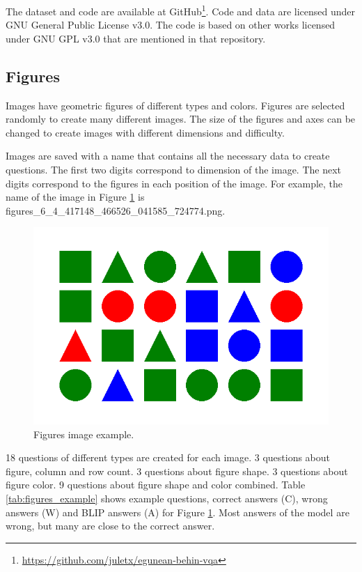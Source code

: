 \documentclass[11pt]{article}
\begin{document}
The dataset and code are available at GitHub\footnote{\url{https://github.com/juletx/egunean-behin-vqa}}. Code and data are licensed under GNU General Public License v3.0. The code is based on other works licensed under GNU GPL v3.0 that are mentioned in that repository.

\subsection{Figures}

Images have geometric figures of different types and colors. Figures are selected randomly to create many different images. The size of the figures and axes can be changed to create images with different dimensions and difficulty. 

Images are saved with a name that contains all the necessary data to create questions. The first two digits correspond to dimension of the image. The next digits correspond to the figures in each position of the image. For example, the name of the image in Figure \ref{fig:figures_example} is figures\_6\_4\_417148\_466526\_041585\_724774.png.

\begin{figure}[ht]
    \centering
    \includegraphics[width=\linewidth]{figures_6_4_417148_466526_041585_724774.png}
    \caption{Figures image example.}
    \label{fig:figures_example}
\end{figure}

18 questions of different types are created for each image. 3 questions about figure, column and row count. 3 questions about figure shape. 3 questions about figure color. 9 questions about figure shape and color combined. Table \ref{tab:figures_example} shows example questions, correct answers (C), wrong answers (W) and BLIP answers (A) for Figure \ref{fig:figures_example}. Most answers of the model are wrong, but many are close to the correct answer.
\end{document}
